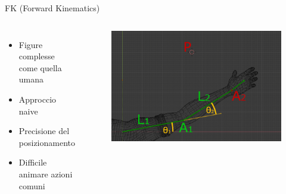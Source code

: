 \documentclass[10pt]{beamer}
\begin{document}
\begin{frame}{FK (Forward Kinematics)}					%
  \begin{columns}[T,onlytextwidth]
		\begin{itemize}[<+- | alert@+>]							%
      \item Figure complesse come quella umana  %
      \item Approccio naive											%
      \item Precisione del posizionamento				%
      \item Difficile animare azioni comuni			%
    \end{itemize}
    \begin{figure}
      \includegraphics[width=.9\linewidth]{figures/17}
    \end{figure}
  \end{columns}
\end{frame}
\end{document}
